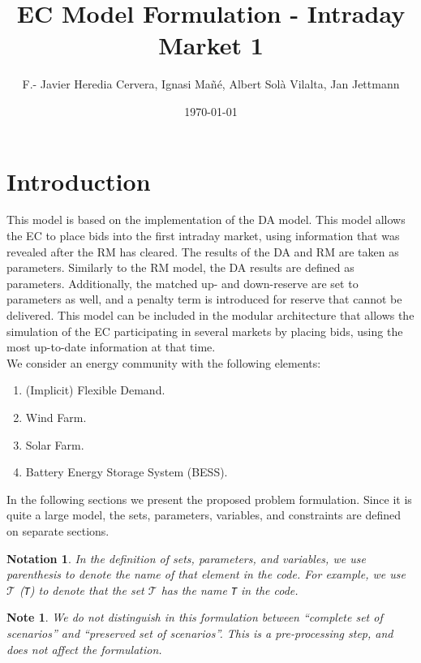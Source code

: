 \documentclass{article}
\title{EC Model Formulation - Intraday Market 1}
\author{F.- Javier Heredia Cervera, Ignasi Mañé, Albert Sol\`a Vilalta, Jan Jettmann}
\date{\today}
\newtheorem{notation}{Notation}[section]
\newtheorem{note}{Note}[section]
\begin{document}
\maketitle

\section{Introduction}
This model is based on the implementation of the DA model. This model allows the EC to place bids into the first intraday market, using information that was revealed after the RM has cleared. The results of the DA and RM are taken as parameters. Similarly to the RM model, the DA results are defined as parameters. Additionally, the matched up- and down-reserve are set to parameters as well, and a penalty term is introduced for reserve that cannot be delivered. This model can be included in the modular architecture that allows the simulation of the EC participating in several markets by placing bids, using the most up-to-date information at that time.\\

We consider an energy community with the following elements:
\begin{enumerate}
	\item (Implicit) Flexible Demand.
	\item Wind Farm.
	\item Solar Farm.
	\item Battery Energy Storage System (BESS).
\end{enumerate}

In the following sections we present the proposed problem formulation. Since it is quite a large model, the sets, parameters, variables, and constraints are defined on separate sections.

\begin{notation}
	In the definition of sets, parameters, and variables, we use parenthesis to denote the name of that element in the code. For example, we use $\mathcal{T}$ (\verb|T|) to denote that the set $\mathcal{T}$ has the name \verb|T| in the code.  
\end{notation}

\begin{note} \label{NOTE:ScenarioTreatment}
	We do not distinguish in this formulation between ``complete set of scenarios'' and ``preserved set of scenarios''. This is a pre-processing step, and does not affect the formulation. 
\end{note}
\end{document}
